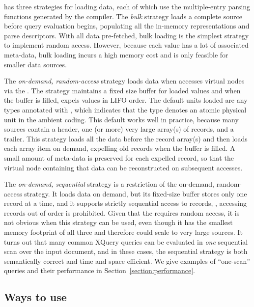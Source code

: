 \padx{} has three strategies for loading data, each of which use the
multiple-entry parsing functions generated by the \pads{} compiler.
The \emph{bulk} strategy loads a complete \pads{} source before query
evaluation begins, populating all the in-memory representations and
parse descriptors.  With all data pre-fetched, bulk loading is the
simplest strategy to implement random access.  However,
because each \pads{} value has a lot of associated meta-data, bulk
loading incurs a high memory cost and is only feasible for smaller
data sources.

The \emph{on-demand, random-access} strategy loads \pads{} data when
\Galax{} accesses virtual nodes via the \absdm{}.  The strategy
maintains a fixed size buffer for loaded values and when the buffer is
filled, expels values in LIFO order.  The default units loaded are
any \pads{} types annotated with , which indicates
that the type denotes an atomic physical unit in the ambient coding.
This default works well in practice, because many \pads{} sources
contain a header, one (or more) very large array(s) of records, and a
trailer.  This strategy loads all the data before the record array(s)
and then loads each array item on demand, expelling old records when
the buffer is filled.  A small amount of meta-data is preserved for
each expelled record, so that the virtual node containing that data
can be reconstructed on subsequent accesses.

The \emph{on-demand, sequential} strategy is a restriction of the
on-demand, random-access strategy.  It loads data on demand, but its
fixed-size buffer stores only one record at a time, and it supports
strictly sequential access to records, \ie{}, accessing records out of
order is prohibited.  Given that the \Galax{} \absdm{} requires random
access, it is not obvious when this strategy can be used, even though
it has the smallest memory footprint of all three and therefore
could scale to very large sources.  It turns out that many common
XQuery queries can be evaluated in \emph{one} sequential scan over the
input document, and in these cases, the sequential strategy is both
semantically correct and time and space efficient.  We give
examples of ``one-scan'' queries and their performance in
Section~\ref{section:performance}. 

\subsection{Ways to use \padx{}} 

